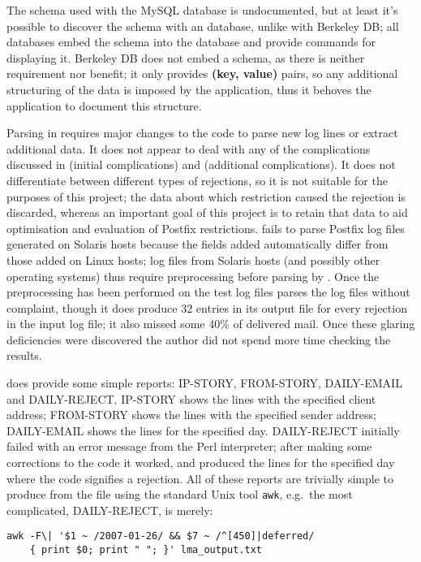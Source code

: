 The schema used with the MySQL database is undocumented, but at least it's
possible to discover the schema with an \SQL{} database, unlike with
Berkeley DB\@; all \SQL{} databases embed the schema into the database and
provide commands for displaying it.  Berkeley DB does not embed a schema,
as there is neither requirement nor benefit; it only provides \textbf{(key,
value)} pairs, so any additional structuring of the data is imposed by the
application, thus it behoves the application to document this structure.

Parsing in \LMA{} requires major changes to the code to parse new log lines
or extract additional data.  It does not appear to deal with any of the
complications discussed in  (initial
complications) and  (additional
complications).  It does not differentiate between different types of
rejections, so it is not suitable for the purposes of this project; the
data about which restriction caused the rejection is discarded, whereas an
important goal of this project is to retain that data to aid optimisation
and evaluation of Postfix restrictions.  \LMA{} fails to parse Postfix log
files generated on Solaris hosts because the fields added automatically
differ from those added on Linux hosts; log files from Solaris hosts (and
possibly other operating systems) thus require preprocessing before parsing
by \LMA{}.  Once the preprocessing has been performed on the
\numberOFlogFILES{} test log files \LMA{} parses the log files without
complaint, though it does produce 32 entries in its output file for every
rejection in the input log file; it also missed some 40\% of delivered
mail.  Once these glaring deficiencies were discovered the author did not
spend more time checking the results.

\LMA{} does provide some simple reports: IP-STORY, FROM-STORY, DAILY-EMAIL
and DAILY-REJECT\@.  IP-STORY shows the \CSV{} lines with the specified
client \IP{} address; FROM-STORY shows the \CSV{} lines with the specified
sender address; DAILY-EMAIL shows the \CSV{} lines for the specified day.
DAILY-REJECT initially failed with an error message from the Perl
interpreter; after making some corrections to the code it worked, and
produced the \CSV{} lines for the specified day where the \SMTP{} code
signifies a rejection.  All of these reports are trivially simple to
produce from the \CSV{} file using the standard Unix tool \texttt{awk},
e.g.\ the most complicated, DAILY-REJECT, is merely:

\begin{verbatim}
awk -F\| '$1 ~ /2007-01-26/ && $7 ~ /^[450]|deferred/
    { print $0; print " "; }' lma_output.txt
\end{verbatim}

